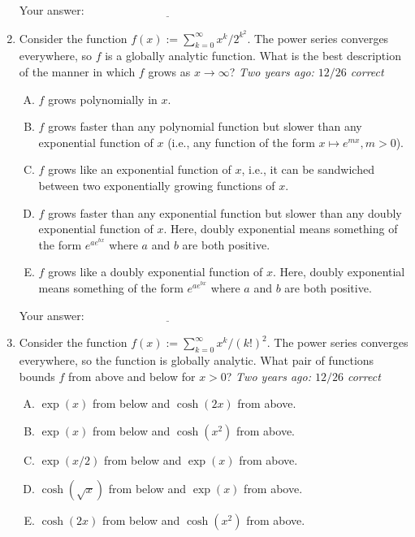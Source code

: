 \documentclass[10pt]{amsart}
\begin{document}
\begin{enumerate}
  \vspace{0.05in}
  Your answer: $\underline{\qquad\qquad\qquad\qquad\qquad\qquad\qquad}$
  \vspace{0.05in}

\item Consider the function $f(x) := \sum_{k=0}^\infty
  x^k/2^{k^2}$. The power series converges everywhere, so $f$ is a
  globally analytic function. What is the best description of the
  manner in which $f$ grows as $x \to \infty$? {\em Two years ago: $12/26$
  correct}

  \begin{enumerate}[(A)]
  \item $f$ grows polynomially in $x$.
  \item $f$ grows faster than any polynomial function but slower than
    any exponential function of $x$ (i.e., any function of the form $x
    \mapsto e^{mx}, m >0$).
  \item $f$ grows like an exponential function of $x$, i.e., it can be
    sandwiched between two exponentially growing functions of $x$.
  \item $f$ grows faster than any exponential function but slower than
    any doubly exponential function of $x$. Here, doubly exponential
    means something of the form $e^{ae^{bx}}$ where $a$ and $b$ are
    both positive.
  \item $f$ grows like a doubly exponential function of $x$. Here,
    doubly exponential means something of the form $e^{ae^{bx}}$ where
    $a$ and $b$ are both positive.
  \end{enumerate}

  \vspace{0.05in}
  Your answer: $\underline{\qquad\qquad\qquad\qquad\qquad\qquad\qquad}$
  \vspace{0.05in}

\item Consider the function $f(x) := \sum_{k=0}^\infty
  x^k/(k!)^2$. The power series converges everywhere, so the function
  is globally analytic. What pair of functions bounds $f$ from above
  and below for $x > 0$? {\em Two years ago: $12/26$ correct}

  \begin{enumerate}[(A)]
  \item $\exp(x)$ from below and $\cosh(2x)$ from above.
  \item $\exp(x)$ from below and $\cosh(x^2)$ from above.
  \item $\exp(x/2)$ from below and $\exp(x)$ from above.
  \item $\cosh(\sqrt{x})$ from below and $\exp(x)$ from above.
  \item $\cosh(2x)$ from below and $\cosh(x^2)$ from above.
  \end{enumerate}


\end{enumerate}
\end{document}
